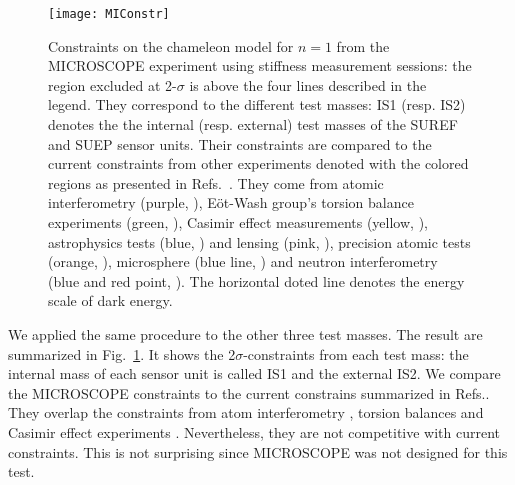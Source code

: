 \documentclass[aps,prd,twocolumn,superscriptaddress,nofootinbib,eqsecnumm,showpacs]{revtex4-1}
\renewcommand\({\left(}
\renewcommand\){\right)}
\renewcommand\[{\left[}
\renewcommand\]{\right]}
\begin{document}
\begin{figure}
\texttt{[image: MIConstr]}
\caption{Constraints on the chameleon model for $n = 1$ from the MICROSCOPE experiment using stiffness measurement sessions: the region excluded at 2-$\sigma$ is above the four lines described in the legend. They correspond to the different test masses: IS1 (resp. IS2) denotes the the internal (resp. external) test masses of the SUREF and SUEP sensor units. Their constraints are compared to the current constraints from other experiments denoted with the colored regions as presented in Refs.~\citep{burrage_tests_2018, BraxReview}. They come from atomic interferometry (purple, \cite{hamilton_atom-interferometry_2015,jaffe_testing_2017}), E\"ot-Wash group's torsion balance experiments (green, \citep{upadhye_dark_2012,PhysRevLett.98.021101}), Casimir effect measurements (yellow, \cite{brax_detecting_2007,PhysRevD.75.077101}), astrophysics tests (blue, \cite{Jain_2013,Cabr__2012,PhysRevD.97.104055}) and lensing (pink, \cite{10.1093/mnras/stw1617}), precision atomic tests (orange, \cite{PhysRevD.83.035020, PhysRevD.82.125020}), microsphere (blue line, \cite{PhysRevLett.117.101101}) and neutron interferometry (blue and red point, \cite{LEMMEL2015310,PhysRevD.93.062001}). The horizontal doted line denotes the energy scale of dark energy.}
\label{fig:MIConstr}
\end{figure}

We applied the same procedure to the other three test masses. The result are summarized in Fig.~\ref{fig:MIConstr}. It shows the 2$\sigma$-constraints from each test mass: the internal mass of each sensor unit is called IS1 and the external IS2. We compare the MICROSCOPE constraints to the current constrains summarized in Refs.\cite{burrage_tests_2018,BraxReview}. They overlap the constraints from atom interferometry \cite{hamilton_atom-interferometry_2015,jaffe_testing_2017}, torsion balances \citep{upadhye_dark_2012,PhysRevLett.98.021101} and Casimir effect experiments \cite{brax_detecting_2007,PhysRevD.75.077101}. Nevertheless, they are not competitive with current constraints. This is not surprising since MICROSCOPE was not designed for this test.
\end{document}
